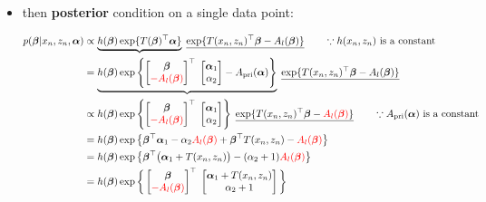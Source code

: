 \documentclass{article}
\def\pri{\text{pri}}
\begin{document}
\begin{itemize}
\item then {\bf posterior} condition on a single data point:

\begin{equation}\begin{split}\label{eq posterior of beta}
p(\bbeta | x_n, z_n, \aalpha) &\propto \underbrace{h (\bbeta) \exp \{ T(\bbeta)^\top \aalpha  \}} \; \underline{\exp\{  T ( x_n, z_n)^\top \bbeta - A_l (\bbeta) \}}  \quad\quad \because h(x_n,z_n) \text{ is a constant}\\
&= \underbrace{h (\bbeta) \exp \left\{\begin{bmatrix} \bbeta \\ {\color{red} - A_l(\bbeta)} \end{bmatrix}^\top \;
\begin{bmatrix} \aalpha_1 \\ \alpha_2  \end{bmatrix}  - A_{\pri} (\aalpha) \right\}}
\; \underline{\exp\{  T ( x_n, z_n)^\top \bbeta - A_l (\bbeta) \}}  \\
&\propto h (\bbeta) \exp \left\{\begin{bmatrix} \bbeta \\ {\color{red} - A_l(\bbeta)} \end{bmatrix}^\top \;
\begin{bmatrix} \aalpha_1 \\ \alpha_2  \end{bmatrix} \right\}
\; \underline{\exp\{  T ( x_n, z_n)^\top \bbeta - {\color{red}A_l (\bbeta)} \}}  \quad\quad \because A_{\pri} (\aalpha) \text{ is a constant}\\
&= h (\bbeta) \exp \big\{ \bbeta^\top \aalpha_1  - \alpha_2 {\color{red}A_l(\bbeta)} +  \bbeta^\top T ( x_n, z_n)  - {\color{red} A_l (\bbeta)}  \big\}  \\
&= h (\bbeta) \exp \big\{ \bbeta^\top \big( \aalpha_1 +  T ( x_n, z_n) \big) - (\alpha_2  + 1 ) {\color{red}A_l(\bbeta)}  \big\}  \\
&= h (\bbeta) \exp \bigg\{ \begin{bmatrix} \bbeta \\ {\color{red}  - A_l(\bbeta)}\end{bmatrix}^\top \;  \begin{bmatrix} \aalpha_1 +  T ( x_n, z_n)  \\ \alpha_2  + 1 \end{bmatrix}  \bigg\}  \\

\end{split}
\end{equation}
\end{itemize}
\end{document}
